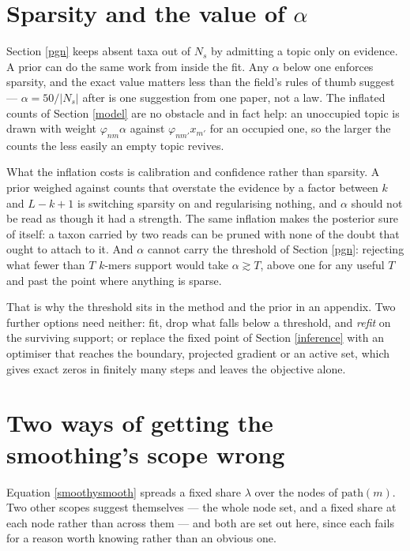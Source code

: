 \documentclass[pdflatex,sn-vancouver-num]{sn-jnl}
\begin{document}
\begin{appendices}
    \section{Sparsity and the value of \texorpdfstring{$\alpha$}{alpha}}\label{sparsity}
    Section \ref{pgn} keeps absent taxa out of $N_s$ by admitting a topic only on evidence. A prior can
    do the same work from inside the fit. Any $\alpha$ below one enforces sparsity, and the exact
    value matters less than the field's rules of thumb suggest --- $\alpha = 50 / \lvert N_s \rvert$
    after \citet{griffiths2004scientific} is one suggestion from one paper, not a law. The inflated
    counts of Section \ref{model} are no obstacle and in fact help: an unoccupied topic is drawn with
    weight $\varphi_{nm} \alpha$ against $\varphi_{nm'} x_{m'}$ for an occupied one, so the larger the
    counts the less easily an empty topic revives.

    What the inflation costs is calibration and confidence rather than sparsity. A prior weighed
    against counts that overstate the evidence by a factor between $k$ and $L - k + 1$ is switching
    sparsity on and regularising nothing, and $\alpha$ should not be read as though it had a strength.
    The same inflation makes the posterior sure of itself: a taxon carried by two reads can be pruned
    with none of the doubt that ought to attach to it. And $\alpha$ cannot carry the threshold of
    Section \ref{pgn}: rejecting what fewer than $T$ $k$-mers support would take
    $\alpha \gtrsim T$, above one for any useful $T$ and past the point where anything is sparse.

    That is why the threshold sits in the method and the prior in an appendix. Two further options
    need neither: fit, drop what falls below a threshold, and \emph{refit} on the surviving support;
    or replace the fixed point of Section \ref{inference} with an optimiser that reaches the boundary,
    projected gradient or an active set, which gives exact zeros in finitely many steps and leaves the
    objective alone.

    \section{Two ways of getting the smoothing's scope wrong}\label{nodesmooth}
    Equation \eqref{smoothysmooth} spreads a fixed share $\lambda$ over the nodes of
    $\mathrm{path}(m)$. Two other scopes suggest themselves --- the whole node set, and a fixed
    share at each node rather than across them --- and both are set out here, since each fails for a
    reason worth knowing rather than an obvious one.


\end{appendices}
\end{document}
